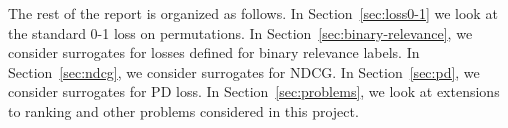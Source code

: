 % 
% 
% 

The rest of the report is organized as follows.
In Section~\ref{sec:loss0-1} we look at the standard 0-1 loss on permutations.
In Section~\ref{sec:binary-relevance}, we consider surrogates for losses
defined for binary relevance labels.
In Section~\ref{sec:ndcg}, we consider surrogates for NDCG.
In Section~\ref{sec:pd}, we consider surrogates for PD loss.
In Section~\ref{sec:problems}, we look at extensions to ranking and other problems considered in this project.